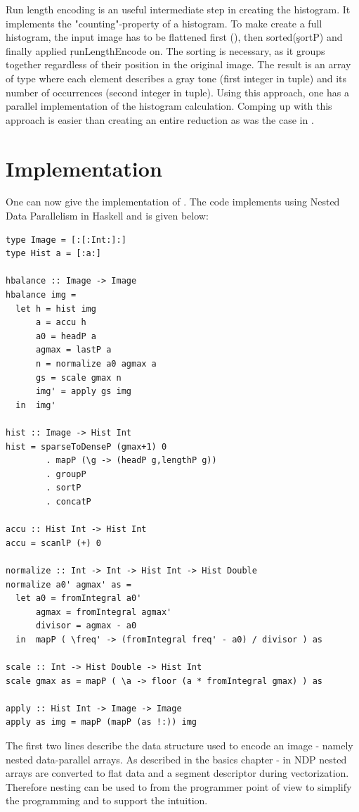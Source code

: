     Run length encoding is an useful intermediate step in
    creating the histogram. It implements the "counting"-property
    of a histogram.
    To make create a full histogram, the input image has to be flattened first (),
    then sorted(\c{sortP}) and finally applied \c{runLengthEncode} on.
    The sorting is necessary, as it groups together regardless of their
    position in the original image.
    The result is an array of type  where each element
    describes a gray tone (first integer in tuple) and its number of
    occurrences (second integer in tuple).
    Using this approach, one has a parallel implementation of the histogram calculation.
    Comping up with this approach is easier than creating an entire
    reduction as was the case in \man.
    
\section{Implementation}
  One can now give the implementation of \ndpn. The code
  implements \algo using Nested Data Parallelism in Haskell
  and is given below:
  \begin{lstlisting}
type Image = [:[:Int:]:]
type Hist a = [:a:]

hbalance :: Image -> Image
hbalance img =
  let h = hist img
      a = accu h
      a0 = headP a
      agmax = lastP a
      n = normalize a0 agmax a
      gs = scale gmax n
      img' = apply gs img
  in  img'

hist :: Image -> Hist Int
hist = sparseToDenseP (gmax+1) 0
        . mapP (\g -> (headP g,lengthP g))
        . groupP
        . sortP
        . concatP

accu :: Hist Int -> Hist Int
accu = scanlP (+) 0

normalize :: Int -> Int -> Hist Int -> Hist Double
normalize a0' agmax' as =
  let a0 = fromIntegral a0'
      agmax = fromIntegral agmax'
      divisor = agmax - a0
  in  mapP ( \freq' -> (fromIntegral freq' - a0) / divisor ) as

scale :: Int -> Hist Double -> Hist Int
scale gmax as = mapP ( \a -> floor (a * fromIntegral gmax) ) as

apply :: Hist Int -> Image -> Image
apply as img = mapP (mapP (as !:)) img
  \end{lstlisting}
  The first two lines describe the data structure used to encode an image - 
  namely nested data-parallel arrays.
  As described in the basics chapter - in NDP
  nested arrays are converted to flat data and a segment descriptor
  during vectorization. Therefore nesting
  can be used to from the programmer point of view to simplify
  the programming and to support the intuition.
  
